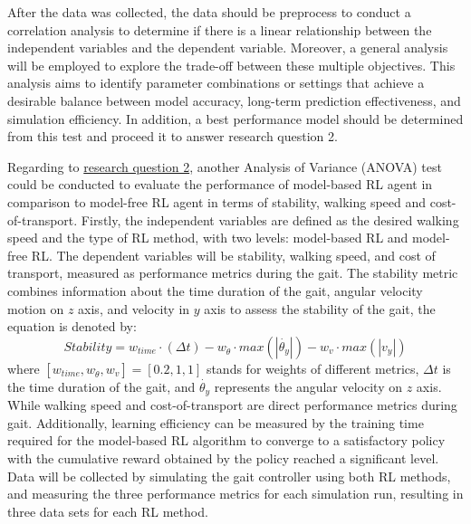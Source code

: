 After the data was collected, the data should be preprocess to conduct a correlation analysis to determine if there is a linear relationship between the independent variables and the dependent variable. Moreover, a general analysis will be employed to explore the trade-off between these multiple objectives. This analysis aims to identify parameter combinations or settings that achieve a desirable balance between model accuracy, long-term prediction effectiveness, and simulation efficiency. In addition, a best performance model should be determined from this test and proceed it to answer research question 2. 

Regarding to \hyperref[rq2]{research question 2}, another Analysis of Variance (ANOVA) test could be conducted to evaluate the performance of model-based RL agent in comparison to model-free RL agent in terms of stability, walking speed and cost-of-transport. Firstly, the independent variables are defined as the desired walking speed and the type of RL method, with two levels: model-based RL and model-free RL. The dependent variables will be stability, walking speed, and cost of transport, measured as performance metrics during the gait. The stability metric combines information about the time duration of the gait, angular velocity motion on $z$ axis, and velocity in $y$ axis to assess the stability of the gait, the equation is denoted by:
\begin{equation}
Stability = w_{time} \cdot (\Delta t) - w_{\Dot{\theta}} \cdot max(|\Dot{\theta_y}|) - w_{v} \cdot max(|v_y|)
\label{eq:stability}
\end{equation}
where $[w_{time},w_{\Dot{\theta}},w_{v}] = [0.2,1,1]$ stands for weights of different metrics, $\Delta t$ is the time duration of the gait, and $\Dot{\theta_y}$ represents the angular velocity on $z$ axis. While walking speed and cost-of-transport are direct performance metrics during gait. Additionally, learning efficiency can be measured by the training time required for the model-based RL algorithm to converge to a satisfactory policy with the cumulative reward obtained by the policy reached a significant level. Data will be collected by simulating the gait controller using both RL methods, and measuring the three performance metrics for each simulation run, resulting in three data sets for each RL method. 
